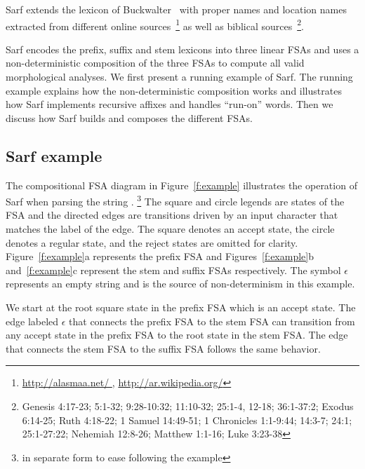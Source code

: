 \documentclass[11pt,letterpaper]{article}
\begin{document}
Sarf extends the lexicon of Buckwalter~ with 
proper names and location names extracted from different online 
sources~\footnote{\href{http://alasmaa.net/}{http://alasmaa.net/ }, 
\href{http://ar.wikipedia.org/}{http://ar.wikipedia.org/}}
as well as biblical sources~\footnote{Genesis 4:17-23; 5:1-32; 9:28-10:32; 11:10-32; 25:1-4, 12-18; 36:1-37:2; Exodus 6:14-25; Ruth 4:18-22; 1 Samuel 14:49-51; 1 Chronicles 1:1-9:44; 14:3-7; 24:1; 25:1-27:22; Nehemiah 12:8-26; Matthew 1:1-16; Luke 3:23-38}.

Sarf encodes the prefix, suffix and stem lexicons into 
three linear FSAs and uses a non-deterministic composition
of the three FSAs to compute all valid morphological analyses.
We first present a running example of Sarf. 
The running example explains
how the non-deterministic composition works and 
illustrates how Sarf implements recursive affixes and
handles ``run-on'' words.
Then we discuss how Sarf builds and composes the different FSAs.

\subsection{Sarf example}
\label{sec:example}

\begin{figure*}[tb]
\end{figure*}

The compositional FSA diagram in Figure~\ref{f:example}
illustrates the operation of Sarf when parsing the
string .
\footnote{ 
%
in separate form to ease following the example
}
The square and circle legends are states of the FSA
and the directed edges are transitions driven by an input
character that matches the label of the edge. 
The square denotes an accept state, 
the circle denotes a regular state, and the reject states
are omitted for clarity. 
Figure~\ref{f:example}a represents the prefix FSA and 
Figures~\ref{f:example}b and~\ref{f:example}c represent the 
stem and suffix FSAs respectively. 
The symbol $\epsilon$ represents an empty string and is 
the source of non-determinism in this example. 

We start at the root square state in the prefix FSA
which is an accept state. 
The edge labeled $\epsilon$ that connects the prefix 
FSA to the stem FSA can transition from any accept state
in the prefix FSA to the root state in the stem FSA.
The edge that connects the stem FSA to the suffix FSA
follows the same behavior. 
\end{document}
